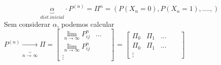 \documentclass[a4paper,12pt]{article}
\begin{document}
 				
\newpage
$$\underbrace{\alpha}_{dist. inicial}\cdot P^{(n)}=\Pi^n=(P(X_n=0),P(X_n=1),....,)$$
Sem considerar $\alpha$, podemos calcular\\

$
P^{(n)}\underbrace{\longrightarrow}_{n\rightarrow\infty}\Pi= \begin{bmatrix} 
\lim\limits_{n\rightarrow\infty}P_{ij}^n&  \dots \\
\lim\limits_{n\rightarrow\infty}P_{ij}^n &  & \\
\vdots &        & 
\end{bmatrix}
$
=
$
\begin{bmatrix} 
\Pi_0&\Pi_1 &  \dots \\
\Pi_0&\Pi_1 &  \dots& & \\
	\vdots &        & 
\end{bmatrix}
$
\end{document}

